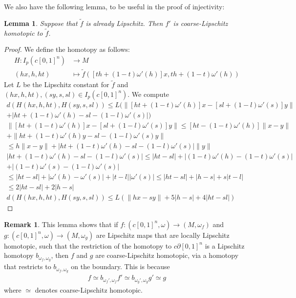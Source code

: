 \documentclass[a4paper,11pt]{article}
\theoremstyle{definition}
\newtheorem*{remark}{Remark}
\theoremstyle{plain}
\newtheorem{lemma}[definition]{Lemma}
\theoremstyle{remark}
\begin{document}
{We also have the following lemma, to be useful in the proof of injectivity:
\begin{lemma} \label{clip} Suppose that $\tilde{f}$ is already Lipschitz. Then $f'$ is coarse-Lipschitz homotopic to $\tilde{f}$. 
\end{lemma}
\begin{proof} We define the homotopy as follows:
\begin{align*}
H:I_{p}(c[0,1]^n)&\rightarrow M\\
(hx,h,ht)&\mapsto \tilde{f}([th+(1-t)\omega'(h)]x, th+(1-t)\omega'(h))
\end{align*}
Let $L$ be the Lipschitz constant for $\tilde{f}$ and $(hx,h,ht), (sy,s,sl)\in I_{p}(c[0,1]^n)$. We compute
\begin{align*}
d(H(hx,h,ht),H(sy,s,sl)) \leq L(\|[ht+(1-t)\omega'(h)]x-[sl+(1-l)\omega'(s)]y\| \\
+ |ht+(1-t)\omega'(h)-sl-(1-l)\omega'(s)|)\\
\|[ht+(1-t)\omega'(h)]x-[sl+(1-l)\omega'(s)]y\| \leq [ht-(1-t)\omega'(h)]\|x-y\|\\
+\|ht+(1-t)\omega'(h)y-sl-(1-l)\omega'(s)y\|\\
\leq h\|x-y\| + |ht+(1-t)\omega'(h)-sl-(1-l)\omega'(s)|\|y\|
\end{align*}
\begin{align*}
|ht+(1-t)\omega'(h)-sl-(1-l)\omega'(s)|\leq |ht-sl| + |(1-t)\omega'(h)-(1-t)\omega'(s)| \\
+ |(1-t)\omega'(s)- (1-l)\omega'(s)|\\
\leq |ht-sl| + |\omega'(h)-\omega'(s)|+|t-l||\omega'(s)| \leq  |ht-sl| + |h-s|+s|t-l|\\
\leq  2|ht-sl| + 2|h-s|\\
d(H(hx,h,ht),H(sy,s,sl)) \leq L(\|hx-sy\|+5|h-s| + 4|ht-sl|)
\end{align*}
\end{proof}

\begin{remark} This lemma shows that if $f : (c[0,1]^n,\omega) \rightarrow (M,\omega_{f})$ and $g: (c[0,1]^n,\omega) \rightarrow (M,\omega_{g})$ are Lipschitz maps that are locally Lipschitz homotopic, such that the restriction of the homotopy to $ c \partial[0,1]^n$ is a Lipschitz homotopy $b_{\omega_{f},\omega_{g}}$, then $f$ and $g$ are coarse-Lipschitz homotopic, via a homotopy that restricts to $b_{\omega_{f},\omega_{g}}$ on the boundary. This is because
\begin{align*}
f\simeq b_{\omega_{f}',\omega_{f}} f' \simeq b_{\omega_{g}',\omega_{g}} g' \simeq g
\end{align*}
where $\simeq$ denotes coarse-Lipschitz homotopic.\\
\end{remark}

}
\end{document}
